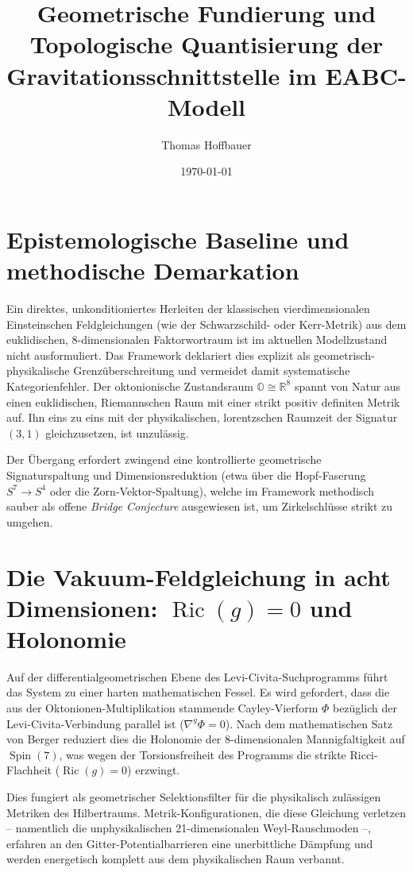 \documentclass[11pt,a4paper]{article}
\title{Geometrische Fundierung und Topologische Quantisierung der Gravitationsschnittstelle im EABC-Modell}
\author{Thomas Hoffbauer}
\date{\today}
\begin{document}
\maketitle

\section{Epistemologische Baseline und methodische Demarkation}

Ein direktes, unkonditioniertes Herleiten der klassischen vierdimensionalen Einsteinschen Feldgleichungen (wie der Schwarzschild- oder Kerr-Metrik) aus dem euklidischen, 8-dimensionalen Faktorwortraum ist im aktuellen Modellzustand nicht ausformuliert. Das Framework deklariert dies explizit als geometrisch-physikalische Grenzüberschreitung und vermeidet damit systematische Kategorienfehler. Der oktonionische Zustandsraum $\mathbb{O} \cong \mathbb{R}^8$ spannt von Natur aus einen euklidischen, Riemannschen Raum mit einer strikt positiv definiten Metrik auf. Ihn eins zu eins mit der physikalischen, lorentzschen Raumzeit der Signatur $(3,1)$ gleichzusetzen, ist unzulässig. 

Der Übergang erfordert zwingend eine kontrollierte geometrische Signaturspaltung und Dimensionsreduktion (etwa über die Hopf-Faserung $S^7 \to S^4$ oder die Zorn-Vektor-Spaltung), welche im Framework methodisch sauber als offene \emph{Bridge Conjecture} ausgewiesen ist, um Zirkelschlüsse strikt zu umgehen.

\section{Die Vakuum-Feldgleichung in acht Dimensionen: $\operatorname{Ric}(g) = 0$ und Holonomie}

Auf der differentialgeometrischen Ebene des Levi-Civita-Suchprogramms führt das System zu einer harten mathematischen Fessel. Es wird gefordert, dass die aus der Oktonionen-Multiplikation stammende Cayley-Vierform $\Phi$ bezüglich der Levi-Civita-Verbindung parallel ist ($\nabla^g \Phi = 0$). Nach dem mathematischen Satz von Berger reduziert dies die Holonomie der 8-dimensionalen Mannigfaltigkeit auf $\operatorname{Spin}(7)$, was wegen der Torsionsfreiheit des Programms die strikte Ricci-Flachheit ($\operatorname{Ric}(g) = 0$) erzwingt.

Dies fungiert als geometrischer Selektionsfilter für die physikalisch zulässigen Metriken des Hilbertraums. Metrik-Konfigurationen, die diese Gleichung verletzen -- namentlich die unphysikalischen 21-dimensionalen Weyl-Rauschmoden --, erfahren an den Gitter-Potentialbarrieren eine unerbittliche Dämpfung und werden energetisch komplett aus dem physikalischen Raum verbannt.
\end{document}
